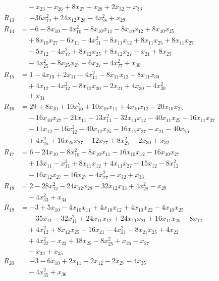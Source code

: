 \begin{align*}
&\quad{}-x_{23}-x_{26}+8x_{27}+x_{28}+2x_{32}-x_{33}\\
R_{13}&=-36x_{12}^{2}+24x_{12}x_{28}-4x_{28}^{2}+x_{29}\\
R_{14}&=-6-8x_{10}-4x_{10}^{2}-8x_{10}x_{11}-8x_{10}x_{12}+8x_{10}x_{25}\\
&\quad{}+8x_{10}x_{27}-6x_{11}-4x_{11}^{2}-8x_{11}x_{12}+8x_{11}x_{25}+8x_{11}x_{27}\\
&\quad{}-5x_{12}-4x_{12}^{2}+8x_{12}x_{25}+8x_{12}x_{27}-x_{21}+8x_{25}\\
&\quad{}-4x_{25}^{2}-8x_{25}x_{27}+6x_{27}-4x_{27}^{2}+x_{30}\\
R_{15}&=1-4x_{10}+2x_{11}-4x_{11}^{2}-8x_{11}x_{12}-8x_{11}x_{30}\\
&\quad{}+4x_{12}-4x_{12}^{2}-8x_{12}x_{30}-2x_{21}+4x_{30}-4x_{30}^{2}\\
&\quad{}+x_{31}\\
R_{16}&=29+8x_{10}+10x_{10}^{2}+10x_{10}x_{11}+4x_{10}x_{12}-20x_{10}x_{25}\\
&\quad{}-16x_{10}x_{27}-21x_{11}-13x_{11}^{2}-32x_{11}x_{12}-40x_{11}x_{25}-16x_{11}x_{27}\\
&\quad{}-11x_{12}-16x_{12}^{2}-40x_{12}x_{25}-16x_{12}x_{27}-x_{21}-40x_{25}\\
&\quad{}+4x_{25}^{2}+16x_{25}x_{27}-12x_{27}+8x_{27}^{2}-2x_{30}+x_{32}\\
R_{17}&=6-24x_{10}-8x_{10}^{2}+8x_{10}x_{11}-16x_{10}x_{12}-16x_{10}x_{27}\\
&\quad{}+13x_{11}-x_{11}^{2}+8x_{11}x_{12}+4x_{11}x_{27}-15x_{12}-8x_{12}^{2}\\
&\quad{}-16x_{12}x_{27}-16x_{27}-4x_{27}^{2}-x_{32}+x_{33}\\
R_{18}&=2-28x_{12}^{2}-24x_{12}x_{28}-32x_{12}x_{33}+4x_{28}^{2}-x_{29}\\
&\quad{}-4x_{33}^{2}+x_{34}\\
R_{19}&=-3+5x_{10}-4x_{10}x_{11}+4x_{10}x_{12}+4x_{10}x_{22}-4x_{10}x_{25}\\
&\quad{}-35x_{11}-32x_{11}^{2}+24x_{11}x_{12}+24x_{11}x_{21}+16x_{11}x_{25}-8x_{12}\\
&\quad{}+4x_{12}^{2}+8x_{12}x_{25}+16x_{21}-4x_{21}^{2}-8x_{21}x_{25}+4x_{22}\\
&\quad{}+4x_{22}^{2}-x_{23}+18x_{25}-8x_{25}^{2}+x_{26}-x_{27}\\
&\quad{}-x_{32}+x_{35}\\
R_{20}&=-3-6x_{10}+2x_{11}-2x_{12}-2x_{27}-4x_{35}\\
&\quad{}-4x_{35}^{2}+x_{36}\\

\end{align*}
